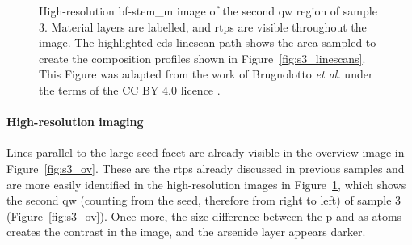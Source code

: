 \begin{figure}
    \centering
    \caption[High-resolution \acs{bf}-\acs{stem_m} image of the second \acl{qw} region of sample 3.]{High-resolution \acs{bf}-\acs{stem_m} image of the second \acl{qw} region of sample 3. Material layers are labelled, and \acs{rtp}s are visible throughout the image. The highlighted \acs{eds} linescan path shows the area sampled to create the composition profiles shown in Figure~\ref{fig:s3_linescans}. This Figure was adapted from the work of Brugnolotto \textit{et al.} \cite{Brugnolotto2023} under the terms of the CC BY 4.0 licence \cite{CCBY40}.}
    \label{fig:s3_QW_HR}
\end{figure}

\paragraph{High-resolution imaging} Lines parallel to the large  seed facet are already visible in the overview image in Figure~\ref{fig:s3_ov}. These are the \acl{rtp}s already discussed in previous samples and are more easily identified in the high-resolution images in Figure~\ref{fig:s3_QW_HR}, which shows the second \acl{qw} (counting from the seed, therefore from right to left) of sample 3 (Figure~\ref{fig:s3_ov}). Once more, the size difference between the \acl{p} and \acl{as} atoms creates the contrast in the image, and the arsenide layer appears darker.
\par

